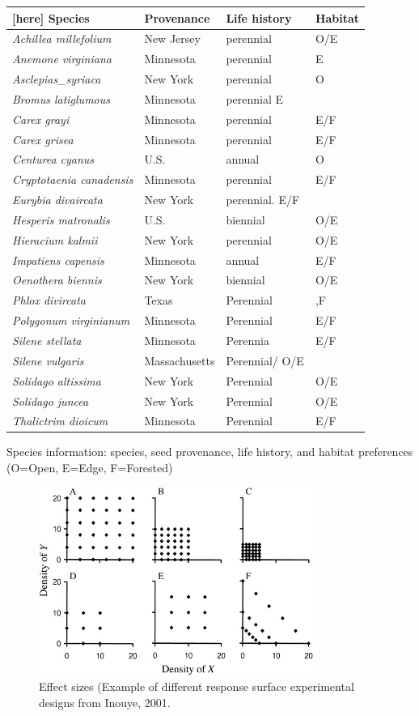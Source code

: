 \documentclass{article}\usepackage[]{graphicx}\usepackage[]{color}
\begin{document}
\begin{center}
\begin{tabular}{|l|l|l|l|}[here]
Species & Provenance & Life history & Habitat\\
\hline
\textit{Achillea millefolium} & New Jersey & perennial & O/E\\
\hline
\textit{Anemone virginiana}& Minnesota & perennial & E\\
\hline
\textit{Asclepias_syriaca}&New York & perennial & O \\
\hline
\textit{Bromus latiglumous}& Minnesota & perennial E \\
\hline
\textit{Carex grayi}&Minnesota & perennial & E/F\\
\hline
\textit{Carex grisea}& Minnesota & perennial & E/F\\
\hline
\textit{Centurea cyanus}& U.S. & annual & O\\
\hline
\textit{Cryptotaenia canadensis} & Minnesota & perennial & E/F\\
\hline
\textit{Eurybia divaircata}& New York & perennial. E/F\\
\hline
\textit{Hesperis matronalis} & U.S. & biennial & O/E\\
\hline
\textit{Hieracium kalmii} & New York & perennial & O/E \\
\hline
\textit{Impatiens capensis} & Minnesota & annual &E/F \\
\hline
\textit{Oenothera biennis} & New York & biennial & O/E \\
\hline
\textit{Phlox divircata} & Texas & Perennial &,F\\
\hline
\textit{Polygonum virginianum} & Minnesota & Perennial & E/F\\
\hline
\textit{Silene stellata} & Minnesota & Perennia & E/F\\
\hline
\textit{Silene vulgaris} & Massachusetts & Perennial/ O/E\\
\hline
\textit{Solidago altissima} & New York & Perennial & O/E\\
\hline
\textit{Solidago juncea} & New York & Perennial & O/E\\
\hline
\textit{Thalictrim dioicum} & Minnesota & Perennial & E/F\\
\hline
\end{tabular}
\caption{Species information: species, seed provenance, life history, and habitat preferences (O=Open, E=Edge, F=Forested)}
\label{table:Table 1}
\end{center}

\begin{figure}[here]
\includegraphics[width=0.8\textwidth]{..//figures/response_surface.jpg}
\caption{Effect sizes (Example of different response surface experimental designs from Inouye, 2001.}
\label{fig:Figure 6}
\end{figure}
\end{document}
